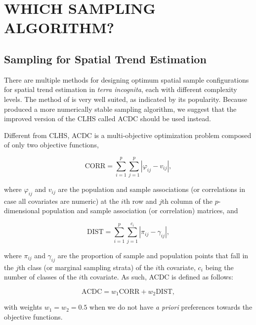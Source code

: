 \section{WHICH SAMPLING ALGORITHM?}

\subsection{Sampling for Spatial Trend Estimation}

There are multiple methods for designing optimum spatial sample configurations for spatial trend estimation in 
\emph{terra incognita}, each with different complexity levels. The method of \citet{MinasnyEtAl2006b} is very 
well suited, as indicated by its popularity. Because \citet{Samuel-RosaEtAl2016} produced a more numerically 
stable sampling algorithm, we suggest that the improved version of the CLHS called ACDC should be used instead.

Different from CLHS, ACDC is a multi-objective optimization problem composed of only two objective functions,

\begin{equation}\label{eqn:chap09-corr}
 \text{CORR} = \sum_{i=1}^{p}\sum_{j=1}^{p}|\varphi_{ij} - v_{ij}|,
\end{equation}

\noindent where $\varphi_{ij}$ and $v_{ij}$ are the population and sample associations (or correlations in case
all covariates are numeric) at the $i$th row and $j$th column of the $p$-dimensional population and sample 
association (or correlation) matrices, and

\begin{equation}\label{eqn:chap09-dist}
 \text{DIST} = \sum_{i=1}^{p}\sum_{j=1}^{c_i} |\pi_{ij} - \gamma_{ij}|,
\end{equation}

\noindent where $\pi_{ij}$ and $\gamma_{ij}$ are the proportion of sample and population points that fall in 
the $j$th class (or marginal sampling strata) of the $i$th covariate, $c_i$ being the number of classes of the 
$i$th covariate. As such, ACDC is defined as follows:

\begin{equation}\label{eqn:chap08-acdc}
 \text{ACDC} = w_1\text{CORR} + w_2 \text{DIST},
\end{equation}

\noindent with weights $w_1 = w_2 = 0.5$ when we do not have \emph{a priori} preferences towards the objective 
functions.

